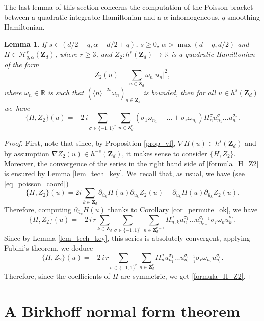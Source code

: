 \documentclass[JEP,XML,SOM,Unicode,NoEqCountersInSection,published]{cedram}
\newtheorem{lemma}[theorem]{Lemma}
\theoremstyle{definition}
\begin{document}
The last lemma of this section concerns the computation of the Poisson bracket between a quadratic integrable Hamiltonian and a $\alpha$-inhomogeneous, $q$-smoothing Hamiltonian.
\begin{lemma}
\label{lem_Z2_vs_H}
If $s\in (d/2-q, \alpha-d/2+q)$, $s\geq 0$, $\alpha >\max(d-q,d/2)$ and $ H\in \mathscr{H}_{q,\alpha}^r(\mathbf{Z}_d)$, where $r\geq 3$, and
$Z_2: h^s(\mathbf{Z}_d) \to \mathbb{R}$ is a quadratic Hamiltonian of the form
\[
Z_2(u) = \sum_{n\in \mathbf{Z}_d} \omega_n |u_n|^2,
\]
where $\omega_n \in \mathbb{R}$ is such that $(\langle n \rangle^{-2s} \omega_n)_{n\in \mathbf{Z}_d}$ is bounded, then for all $u\in h^s(\mathbf{Z}_d)$ we~have%
\begin{equation}
\label{formula_H_Z2}
\{ H, Z_2\}(u) = -2 \, i \sum_{\sigma \in \{-1,1\}^{r}} \sum_{n\in \mathbf{Z}_d^r } (\sigma_1 \omega_{n_1} + \dots + \sigma_r \omega_{n_r}) H_{n}^{\sigma} u_{n_1}^{\sigma_1} \dots u_{n_r}^{\sigma_r}.
\end{equation}
\end{lemma}
\begin{proof} First, note that since, by Proposition \ref{prop_vf}, $\nabla H(u) \in h^s(\mathbf{Z}_d)$ and by assump\-tion $\nabla Z_2(u) \in h^{-s}(\mathbf{Z}_d)$, it makes sense to consider $\{ H, Z_2\}$. Moreover, the convergence of the series in the right hand side of \eqref{formula_H_Z2} is ensured by Lemma \ref{lem_tech_key}.
We~recall that, as usual, we have (see \eqref{eq_poisson_coord})
\[
\{ H, Z_2\}(u) = 2i \sum_{k\in \mathbf{Z}_d} \partial_{\bar{u}_k}H(u) \partial_{u_k} Z_2(u) - \partial_{u_k}H(u) \partial_{\bar{u}_k} Z_2(u).
\]
Therefore, computing $\partial_{\bar{u}_k}H(u)$ thanks to Corollary \ref{cor_permute_ok}, we have
\[
\{ H, Z_2\}(u) = -2 \, i \,r \sum_{k\in \mathbf{Z}_d} \sum_{\sigma \in \{-1,1\}^{r}} \sum_{n\in \mathbf{Z}_d^{r-1} } H_{n,k}^{\sigma} u_{n_1}^{\sigma_1} \dots u_{n_{r-1}}^{\sigma_{r-1}} \sigma_r \omega_k u_k^{\sigma_r}.
\]
Since by Lemma \ref{lem_tech_key}, this series is absolutely convergent, applying Fubini's theorem, we deduce
\[
\{ H, Z_2\}(u) = -2 \, i\,r \sum_{\sigma \in \{-1,1\}^{r}} \sum_{n\in \mathbf{Z}_d^r } H_{n}^{\sigma} u_{n_1}^{\sigma_1} \dots u_{n_{r-1}}^{\sigma_{r-1}} \sigma_r \omega_{n_r} u_{n_r}^{\sigma_r}.
\]
Therefore, since the coefficients of $H$ are symmetric, we get \eqref{formula_H_Z2}.
\end{proof}

\section{A Birkhoff normal form theorem}
\end{document}
